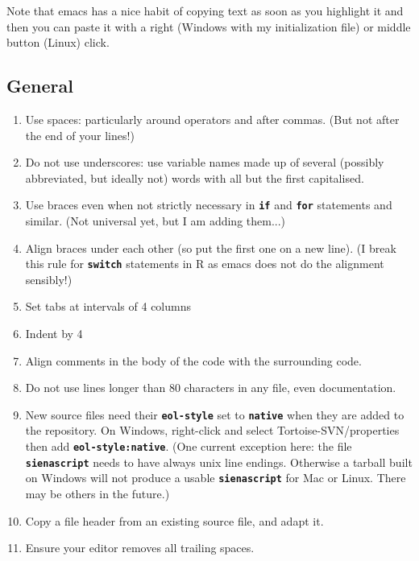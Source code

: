 \documentclass[12pt, a4paper]{article}
\renewcommand{\=}{\,=\,}
\newcommand{\+}{\,+\,}
\newcommand{\sfn}[1]{\textbf{\texttt{#1}}}
\begin{document}
Note that emacs has a nice habit of copying text as soon as you highlight it and
then you can paste it with a right (Windows with my initialization file) or
middle button (Linux) click.
\subsection{General}
\begin{enumerate}
\item Use spaces: particularly around operators and after commas. (But
  not after the end of your lines!)
\item Do not use underscores: use variable names made up of several (possibly
  abbreviated, but ideally not) words with all but the first capitalised.
\item Use braces even when not strictly necessary in \sfn{if} and \sfn{for}
  statements and similar. (Not universal yet, but I am adding them...)
\item Align braces under each other (so put the first one on a new line). (I
  break this rule for \sfn{switch} statements in R as emacs does not do the
  alignment sensibly!)
\item Set tabs at intervals of 4 columns
\item Indent by 4
\item Align comments in the body of the code with the surrounding code.
\item Do not use lines longer than 80 characters in any file, even
  documentation.
\item New source files need their \sfn{eol-style} set to \sfn{native} when they
  are added to the repository. On Windows, right-click and select
  Tortoise-SVN/properties then add \sfn{eol-style:native}.  (One current
  exception here: the file \sfn{sienascript} needs to have always unix line
  endings. Otherwise a tarball built on Windows will not produce a usable
  \sfn{sienascript} for Mac or Linux. There may be others in the future.)
\item Copy a file header from an existing source file, and adapt it.
\item Ensure your editor removes all trailing spaces.
\end{enumerate}
\end{document}
